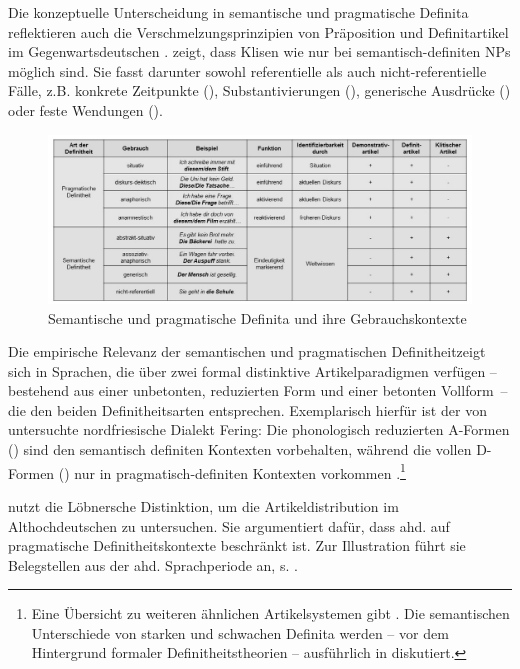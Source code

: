 Die konzeptuelle Unterscheidung in semantische und pragmatische Definita reflektieren auch  die Verschmelzungsprinzipien von Präposition und Definitartikel im Gegenwartsdeutschen \parencite[311-312]{Lobner1985}. \textcite[109-110]{Nubling2005} zeigt, dass Klisen wie  nur bei semantisch-definiten NPs möglich sind. Sie fasst darunter sowohl referentielle als auch nicht-referentielle Fälle, z.B. konkrete Zeitpunkte (),  Substantivierungen (), generische Ausdrücke () oder feste Wendungen (). 

\begin{figure}[h]
\includegraphics[width=\textwidth]{images/definit-kontexte-neu-sw.jpg}
\caption {Semantische und pragmatische Definita und ihre Gebrauchskontexte\label{abb:definita}}
\end{figure}

Die empirische Relevanz der semantischen und pragmatischen Definitheit\linebreak zeigt sich in Sprachen, die über zwei formal distinktive Artikelparadigmen verfügen -- bestehend aus einer unbetonten, reduzierten Form und einer betonten Vollform~-- die den beiden Definitheitsarten entsprechen. Exemplarisch hierfür ist der von \textcite{Ebert1971} untersuchte  nordfriesische Dialekt Fering: Die phonologisch reduzierten A-Formen () sind den semantisch definiten Kontexten vorbehalten, während die vollen D-Formen () nur in pragmatisch-definiten Kontexten vorkommen \parencite[529]{deMulder2011}.\footnote{Eine Übersicht zu weiteren ähnlichen Artikelsystemen gibt \textcite[]{Studler2011}. Die semantischen Unterschiede von starken und schwachen Definita werden -- vor dem Hintergrund formaler Definitheitstheorien -- ausführlich in \textcite{Schwarz2009} diskutiert.}

\textcite[112--117]{Demske2001} nutzt die Löbnersche Distinktion, um die Artikeldistribution im Althochdeutschen zu untersuchen. Sie argumentiert dafür, dass ahd.   auf pragmatische Definitheitskontexte beschränkt ist. Zur Illustration führt sie Belegstellen aus der ahd. Sprachperiode an, s. . 

